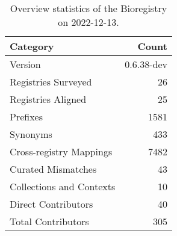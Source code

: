 \begin{table}
\centering
\caption{Overview statistics of the Bioregistry on 2022-12-13.}
\label{tab:bioregistry-summary}
\begin{tabular}{lr}
\toprule
                Category &      Count \\
\midrule
                 Version & 0.6.38-dev \\
     Registries Surveyed &         26 \\
      Registries Aligned &         25 \\
                Prefixes &       1581 \\
                Synonyms &        433 \\
 Cross-registry Mappings &       7482 \\
      Curated Mismatches &         43 \\
Collections and Contexts &         10 \\
     Direct Contributors &         40 \\
      Total Contributors &        305 \\
\bottomrule
\end{tabular}
\end{table}
